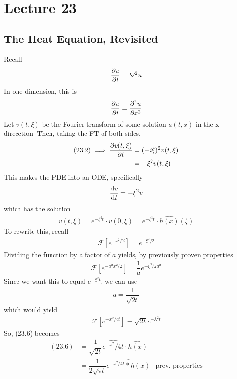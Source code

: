 \section{Lecture 23}
\subsection{The Heat Equation, Revisited}
Recall
\begin{align}
    \pdv{u}{t} = \laplacian u
\end{align}
In one dimension, this is
\begin{align}
    \pdv{u}{t} = \pdv[2]{u}{x}
\end{align}
Let $v(t, \xi)$ be the Fourier transform of some solution $u(t, x)$ in the x-direection. Then, taking the FT of both sides,
\begin{align}
    (23.2) \implies \pdv{v(t, \xi)}{t} &= (-i\xi)^2 v(t, \xi)\\
    &= -\xi^2 v(t, \xi)
\end{align}
This makes the PDE into an ODE, specifically
\begin{align}
    \dv{v}{t} = -\xi^2 v
\end{align}
which has the solution
\begin{align}
    v(t, \xi) = e^{-\xi^2t} \cdot v(0, \xi) = e^{-\xi^2 t} \cdot \widehat{h(x)}(\xi)
\end{align}
To rewrite this, recall
\begin{align}
    \mathcal{F}\left[ e^{-x^2/2} \right] = e^{-\xi^2/2}
\end{align}
Dividing the function by a factor of $a$ yields, by previously proven properties
\begin{align}
    \mathcal{F}\left[ e^{-a^2x^2/2} \right] = \dfrac{1}{a} e^{-\xi^2/2a^2}
\end{align}
Since we want this to equal $e^{-\xi^2 t}$, we can use
\begin{align}
    a = \dfrac{1}{\sqrt{2t}}
\end{align}
which would yield
\begin{align}
    \mathcal{F}\left[ e^{-x^2/4t} \right] = \sqrt{2t}e^{-\lambda^2t}
\end{align}
So, (23.6) becomes
\begin{align}
    (23.6) &= \dfrac{1}{\sqrt{2t}} \widehat{e^{-x^2}/4t} \cdot \widehat{h(x)}\\
    &= \dfrac{1}{2\sqrt{\pi t}} \widehat{e^{-x^2/4t} * h(x)} & \text{prev. properties}
\end{align}

